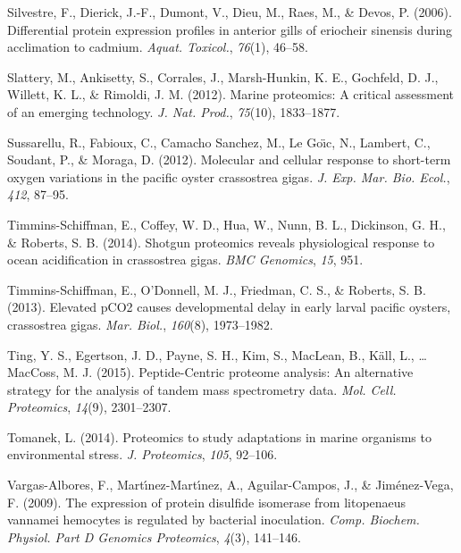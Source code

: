 \documentclass [11pt, proquest] {uwthesis}[2015/03/03]
\newlength{\cslhangindent}
\newenvironment{CSLReferences}%
{\setlength{\parindent}{0pt}%
\everypar{\setlength{\hangindent}{\cslhangindent}}\ignorespaces}%
{\par}
\begin{document}
\begin{CSLReferences}{1}{0}
\leavevmode\hypertarget{ref-Silvestre2006}{}%
Silvestre, F., Dierick, J.-F., Dumont, V., Dieu, M., Raes, M., \& Devos, P. (2006). Differential protein expression profiles in anterior gills of eriocheir sinensis during acclimation to cadmium. \emph{Aquat. Toxicol.}, \emph{76}(1), 46--58.

\leavevmode\hypertarget{ref-Slattery2012}{}%
Slattery, M., Ankisetty, S., Corrales, J., Marsh-Hunkin, K. E., Gochfeld, D. J., Willett, K. L., \& Rimoldi, J. M. (2012). Marine proteomics: A critical assessment of an emerging technology. \emph{J. Nat. Prod.}, \emph{75}(10), 1833--1877.

\leavevmode\hypertarget{ref-Sussarellu2012}{}%
Sussarellu, R., Fabioux, C., Camacho Sanchez, M., Le Goı̈c, N., Lambert, C., Soudant, P., \& Moraga, D. (2012). Molecular and cellular response to short-term oxygen variations in the pacific oyster crassostrea gigas. \emph{J. Exp. Mar. Bio. Ecol.}, \emph{412}, 87--95.

\leavevmode\hypertarget{ref-Timmins-Schiffman2014}{}%
Timmins-Schiffman, E., Coffey, W. D., Hua, W., Nunn, B. L., Dickinson, G. H., \& Roberts, S. B. (2014). Shotgun proteomics reveals physiological response to ocean acidification in crassostrea gigas. \emph{BMC Genomics}, \emph{15}, 951.

\leavevmode\hypertarget{ref-Timmins-Schiffman2013}{}%
Timmins-Schiffman, E., O'Donnell, M. J., Friedman, C. S., \& Roberts, S. B. (2013). Elevated {pCO2} causes developmental delay in early larval pacific oysters, crassostrea gigas. \emph{Mar. Biol.}, \emph{160}(8), 1973--1982.

\leavevmode\hypertarget{ref-Ting2015}{}%
Ting, Y. S., Egertson, J. D., Payne, S. H., Kim, S., MacLean, B., Käll, L., \ldots{} MacCoss, M. J. (2015). {Peptide-Centric} proteome analysis: An alternative strategy for the analysis of tandem mass spectrometry data. \emph{Mol. Cell. Proteomics}, \emph{14}(9), 2301--2307.

\leavevmode\hypertarget{ref-Tomanek2014}{}%
Tomanek, L. (2014). Proteomics to study adaptations in marine organisms to environmental stress. \emph{J. Proteomics}, \emph{105}, 92--106.

\leavevmode\hypertarget{ref-Vargas-Albores2009}{}%
Vargas-Albores, F., Martı́nez-Martı́nez, A., Aguilar-Campos, J., \& Jiménez-Vega, F. (2009). The expression of protein disulfide isomerase from litopenaeus vannamei hemocytes is regulated by bacterial inoculation. \emph{Comp. Biochem. Physiol. Part D Genomics Proteomics}, \emph{4}(3), 141--146.


\end{CSLReferences}
\end{document}
